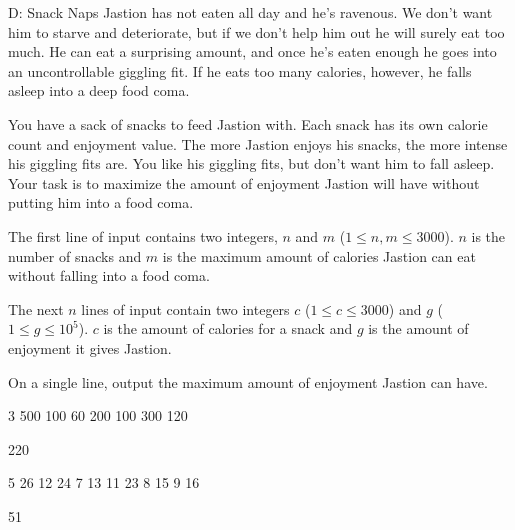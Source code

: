 \begin{problem}{D: Snack Naps}
Jastion has not eaten all day and he's ravenous. We don't want him to starve and deteriorate, but if we don't help him out he will surely eat too much. He can eat a surprising amount, and once he's eaten enough he goes into an uncontrollable giggling fit. If he eats too many calories, however, he falls asleep into a deep food coma.

You have a sack of snacks to feed Jastion with. Each snack has its own calorie count and enjoyment value. The more Jastion enjoys his snacks, the more intense his giggling fits are. You like his giggling fits, but don't want him to fall asleep. Your task is to maximize the amount of enjoyment Jastion will have without putting him into a food coma.
\end{problem}

\begin{formalin}
The first line of input contains two integers, $n$ and $m$ ($1 \leq n, m \leq 3000$).
$n$ is the number of snacks and $m$ is the maximum amount of calories Jastion can eat without falling into a food coma.

The next $n$ lines of input contain two integers $c$ ($1 \leq c \leq 3000$) and $g$ ($1 \leq g \leq 10^5$). $c$ is the amount of calories for a snack and $g$ is the amount of enjoyment it gives Jastion.
\end{formalin}

\begin{formalout}
On a single line, output the maximum amount of enjoyment Jastion can have.
\end{formalout}

\begin{datain}
3 500
100 60
200 100
300 120
\end{datain}
\begin{dataout}
220
\end{dataout}

\begin{datain}
5 26
12 24
7 13
11 23
8 15
9 16
\end{datain}
\begin{dataout}
51
\end{dataout}